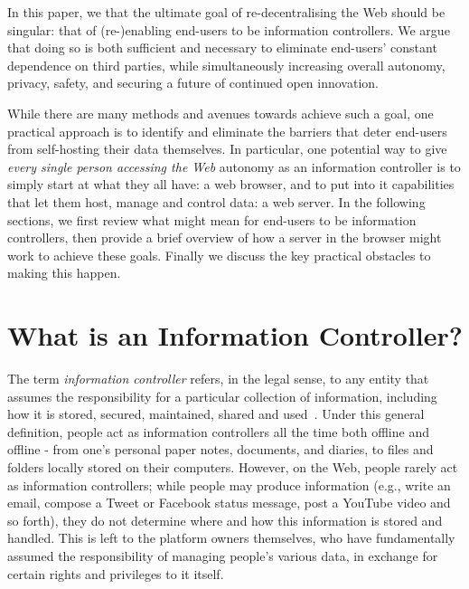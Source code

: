 \documentclass{amsart}
\begin{document}
In this paper, we that the ultimate goal of re-decentralising the Web should be singular: that of (re-)enabling end-users to be information controllers.  We argue that doing so is both sufficient and necessary to eliminate end-users' constant dependence on third parties, while simultaneously increasing overall autonomy, privacy, safety, and securing a future of continued open innovation.  

While there are many methods and avenues towards achieve such a goal, one practical approach is to identify and eliminate the barriers that deter end-users from self-hosting their data themselves.  In particular, one potential way to give \emph{every single person accessing the Web} autonomy as an information controller is to simply start at what they all have: a web browser, and to put into it capabilities that let them host, manage and control data: a web server.  In the following sections, we first review what might mean for end-users to be information controllers, then provide a brief overview of how a server in the browser might work to achieve these goals.  Finally we discuss the key practical obstacles to making this happen.



\section{What is an Information Controller?}

The term \emph{information controller} refers, in the legal sense, to any entity that assumes the responsibility for  a particular collection of information, including how it is stored, secured, maintained, shared and used~\cite{}.  Under this general definition, people act as information controllers all the time both offline and offline - from one's personal paper notes, documents, and diaries, to files and folders locally stored on their computers.  However, on the Web, people rarely act as information controllers; while people may produce information (e.g., write an email, compose a Tweet or Facebook status message, post a YouTube video and so forth), they do not determine where and how this information is stored and handled.  This is left to the platform owners themselves, who have fundamentally assumed the responsibility of managing people's various data, in exchange for certain rights and privileges to it itself.
\end{document}
